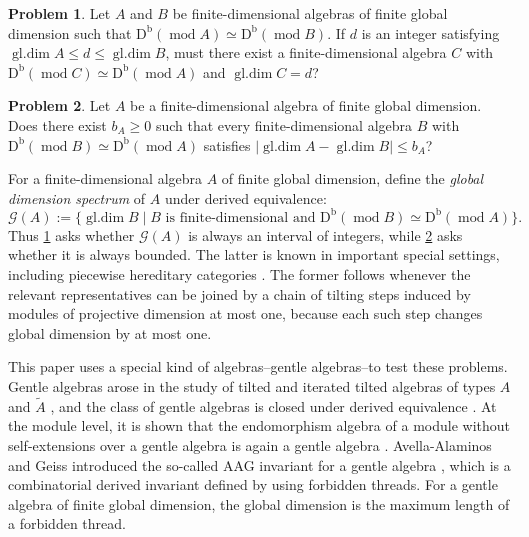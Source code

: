 \documentclass[11pt]{amsart}
\theoremstyle{definition}
\newtheorem{problem}{Problem}
\theoremstyle{plain}
\theoremstyle{definition}
\theoremstyle{definition}
\newcommand{\Db}{\mathrm D^{\mathrm b}}
\newcommand{\modu}{\operatorname{mod}}
\newcommand{\gldim}{\operatorname{gl.dim}}
\newcommand{\GSpec}{\mathcal G}
\begin{document}
\begin{problem}
\label{prob:interval}
Let $A$ and $B$ be finite-dimensional algebras of finite global dimension such
that $\Db(\modu A)\simeq\Db(\modu B)$.  If $d$ is an integer satisfying
$\gldim A\leq d\leq\gldim B$, must there exist a finite-dimensional algebra
$C$ with $\Db(\modu C)\simeq\Db(\modu A)$ and $\gldim C=d$?
\end{problem}

\begin{problem}
\label{prob:boundedness}
Let $A$ be a finite-dimensional algebra of finite global dimension.  Does
there exist $b_A\geq0$ such that every finite-dimensional algebra $B$ with
$\Db(\modu B)\simeq\Db(\modu A)$ satisfies
$|\gldim A-\gldim B|\leq b_A$?
\end{problem}

For a finite-dimensional algebra $A$ of finite global dimension, define the \emph{global dimension spectrum} of $A$ under derived equivalence:
\begin{equation}
\label{eq:GSpec-definition}
 \GSpec(A):=
 \{\gldim B\mid B\text{ is finite-dimensional and }
                   \Db(\modu B)\simeq\Db(\modu A)\}.
\end{equation}
Thus \cref{prob:interval} asks whether $\GSpec(A)$ is always an interval of
integers, while \cref{prob:boundedness} asks whether it is always bounded.
The latter is known in important special settings, including piecewise
hereditary categories \cite{HappelReitenSmalo,Ladkani}.  The former follows
whenever the relevant representatives can be joined by a chain of tilting
steps induced by modules of projective dimension at most one, because each
such step changes global dimension by at most one.

This paper uses a special kind of algebras--gentle algebras--to test these problems. 
Gentle algebras
arose in the study of tilted and iterated tilted algebras of types $A$
and $\widetilde A$ \cite{AssemHappel,AssemSkowronski}, and the class of
gentle algebras is closed under derived equivalence
\cite{SchroerZimmermann}. At the module level, it is shown that the endomorphism algebra
of a module without self-extensions over a gentle algebra is again a 
gentle algebra \cite{Schroer1999Modules}. Avella-Alaminos and Geiss introduced the so-called AAG invariant for a gentle algebra \cite{AvellaAlaminosGeiss}, which is a
combinatorial derived invariant defined by using forbidden threads.  For a gentle algebra of finite global dimension, the global
dimension is the maximum length of a forbidden thread.
\end{document}
